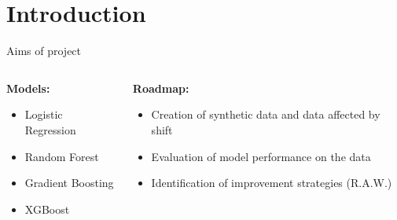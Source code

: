 
%  




\section{Introduction}


\begin{frame}{Aims of project}
	\begin{columns} %
		\begin{column}{0.5\textwidth}
			\textbf{Models:}
			\begin{tcolorbox}[colframe=blue!50!black, colback=blue!5, coltitle=black, sharp corners]
				\begin{itemize}
					\item Logistic Regression
					\item Random Forest
					\item Gradient Boosting
					\item XGBoost
				\end{itemize}
			\end{tcolorbox}
		\end{column}
		
		\vspace{0.5cm}
		\begin{column}{0.5\textwidth}
			\textbf{Roadmap:}
			\begin{itemize}
				\item Creation of synthetic data and data affected by shift
				\item Evaluation of model performance on the data
				\item Identification of improvement strategies (R.A.W.)
			\end{itemize}
		\end{column}
	\end{columns} %
\end{frame}


